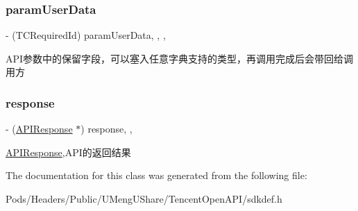 \subsubsection{\texorpdfstring{param\+User\+Data}{paramUserData}}
{\footnotesize\ttfamily -\/ (T\+C\+Required\+Id) param\+User\+Data\hspace{0.3cm}{\ttfamily [read]}, {\ttfamily [write]}, {\ttfamily [nonatomic]}, {\ttfamily [retain]}}

A\+P\+I参数中的保留字段，可以塞入任意字典支持的类型，再调用完成后会带回给调用方 \mbox{\label{interface_t_c_a_p_i_request_ab44c438c454d8193e574e09909249a16}} 
\subsubsection{\texorpdfstring{response}{response}}
{\footnotesize\ttfamily -\/ (\mbox{\hyperlink{interface_a_p_i_response}{A\+P\+I\+Response}} $\ast$) response\hspace{0.3cm}{\ttfamily [read]}, {\ttfamily [nonatomic]}, {\ttfamily [assign]}}

\mbox{\hyperlink{interface_a_p_i_response}{A\+P\+I\+Response}},A\+P\+I的返回结果 

The documentation for this class was generated from the following file\+:\begin{DoxyCompactItemize}
\item 
Pods/\+Headers/\+Public/\+U\+Meng\+U\+Share/\+Tencent\+Open\+A\+P\+I/sdkdef.\+h\end{DoxyCompactItemize}
